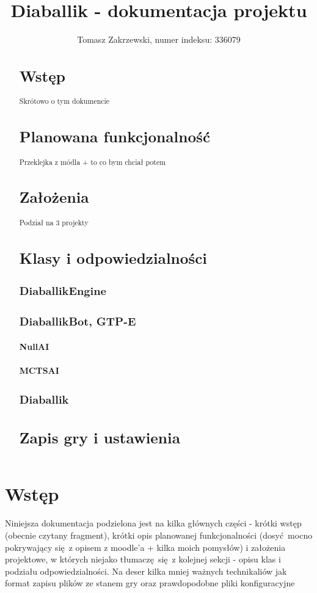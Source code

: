 \documentclass[a4paper,12pt]{article}
\title{Diaballik - dokumentacja projektu}
\author{Tomasz Zakrzewski, numer indeksu: 336079}
\begin{document}
\maketitle

\begin{abstract}
\section{Wstęp}
Skrótowo o tym dokumencie
\section{Planowana funkcjonalność}
Przeklejka z módla + to co bym chciał potem
\section{Założenia}
Podział na 3 projekty
\section{Klasy i odpowiedzialności}
\subsection{DiaballikEngine}
\subsection{DiaballikBot, GTP-E}
\subsubsection{NullAI}
\subsubsection{MCTSAI}
\subsection{Diaballik}
\section{Zapis gry i ustawienia}
\end{abstract}

\setcounter{section}{0}

\section{Wstęp}
Niniejsza dokumentacja podzielona jest na kilka głównych części - krótki wstęp (obecnie czytany fragment), krótki opis planowanej funkcjonalności 
(dosyć mocno pokrywający się z opisem z moodle'a + kilka moich pomysłów) i założenia projektowe, w których niejako tłumaczę się z kolejnej sekcji -
opisu klas i podziału odpowiedzialności. Na deser kilka mniej ważnych technikaliów jak format zapisu plików ze stanem gry oraz prawdopodobne pliki
konfiguracyjne
\end{document}
